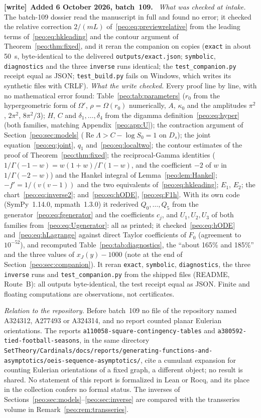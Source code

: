 \documentclass[11pt]{article}
\numberwithin{equation}{section}
\theoremstyle{remark}\newtheorem{remark}[theorem]{Remark}
\DeclareMathOperator{\Ree}{Re}
\newcommand{\file}[1]{\nolinkurl{#1}}
\newenvironment{writenote}[1][]{\par\smallskip\begingroup\small
 \noindent\textbf{[write]}\if\relax\detokenize{#1}\relax\else~\textbf{#1.}\fi\ }%
 {\par\endgroup\smallskip}
\begin{document}
\begin{writenote}[Added 6 October 2026, batch~109]
\emph{What was checked at intake.} The batch-109 dossier read the
manuscript in full and found no error; it checked the relative correction
$2/(mL)$ of~\eqref{peo:eq:previewrelative} from the leading terms
of~\eqref{peo:eq:hkleading} and the contour argument of
Theorem~\ref{peo:thm:fixed}, and it reran the companion on copies
(\file{exact} in about 50~s, byte-identical to the delivered
\file{outputs/exact.json}; \file{symbolic}, \file{diagnostics} and the three
\file{inverse} runs identical; the \file{test\_companion.py} receipt equal as
JSON; \file{test\_build.py} fails on Windows, which writes its synthetic
files with CRLF). \emph{What the write checked.} Every proof line by line,
with no mathematical error found: Table~\ref{peo:tab:parameters} ($r_0$ from
the hypergeometric form of $\Omega'$, $\rho=\Omega(r_0)$ numerically, $A$,
$\kappa_0$ and the amplitudes $\pi^2$, $2\pi^2$, $8\pi^2/3$);
$H$, $C$ and $\delta_1,\dots,\delta_4$ from the digamma
definition~\eqref{peo:eq:hyper} (both families, matching
Appendix~\ref{peo:app:U}); the contraction argument of Section~\ref{peo:sec:models}
($\Ree\Lambda>C-\log S_0=1$ on $D_s$); the joint
equation~\eqref{peo:eq:joint}, $q_1$ and~\eqref{peo:eq:localtwo}; the
contour estimates of the proof of Theorem~\ref{peo:thm:fixed}; the
reciprocal-Gamma identities ($1/\Gamma(-1-w)=w(1+w)/\Gamma(1-w)$, and the
coefficient $-2$ of $w$ in $1/\Gamma(-2-w)$) and the Hankel integral of
Lemma~\ref{peo:lem:Hankel}; $-f'=1/(v(v-1))$ and the two equivalents
of~\eqref{peo:eq:hkleading}; $E_1$, $E_2$; the chart~\eqref{peo:eq:inverse2};
and~\eqref{peo:eq:hODE}, \eqref{peo:eq:F1h}. With its own code (SymPy~1.14.0,
mpmath~1.3.0) it rederived $Q_0,\dots,Q_5$ from the
generator~\eqref{peo:eq:fgenerator} and the coefficients $c_j$, and
$U_1,U_2,U_3$ of both families from~\eqref{peo:eq:Ugenerator}: all as
printed; it checked~\eqref{peo:eq:hODE} and~\eqref{peo:eq:hLagrange}
against direct Taylor coefficients of $F_0$ (agreement to $10^{-52}$), and
recomputed Table~\ref{peo:tab:diagnostics}, the ``about 165\% and 185\%''
and the three values of $x_J(y)-1000$ (note at the end of
Section~\ref{peo:sec:companion}). It reran \file{exact},
\file{symbolic}, \file{diagnostics}, the three \file{inverse} runs and
\file{test\_companion.py} from the shipped files (README, Route~B): all
outputs byte-identical, the test receipt equal as JSON. Finite and floating
computations are observations, not certificates.

\emph{Relation to the repository.} Before batch~109 no file of the
repository named A324312, A277493 or A324314, and no report counted planar
Eulerian orientations. The reports
\file{a110058-square-contingency-tables} and
\file{a380592-tied-football-seasons}, in the same directory
\file{SetTheory/Cardinals/docs/reports/generating-functions-and-asymptotics/oeis-sequence-asymptotics/},
cite a cumulant expansion for counting Eulerian orientations of a fixed
graph, a different object; no result is shared. No statement of this report
is formalized in Lean or Rocq, and its place in the collection confers no
formal status. The inverses of Sections~\ref{peo:sec:models}--\ref{peo:sec:inverse}
are compared with the transseries volume in
Remark~\ref{peo:rem:transseries}.
\end{writenote}
\end{document}
